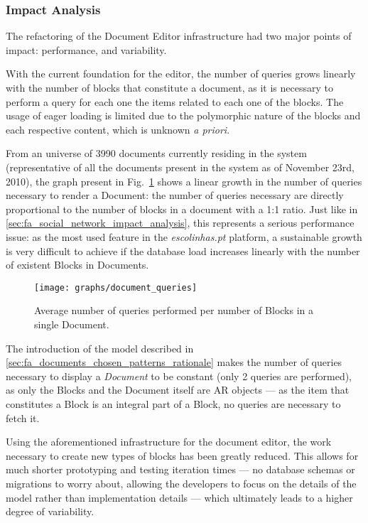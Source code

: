 \subsubsection{Impact Analysis}\label{sec:fa_documents_impact_analysis}

The refactoring of the Document Editor infrastructure had two major points of impact: performance, and variability.


With the current foundation for the editor, the number of queries grows linearly with the number of blocks that constitute a document, as it is necessary to perform a query for each one the items related to each one of the blocks. The usage of eager loading is limited due to the polymorphic nature of the blocks and each respective content, which is unknown \emph{a priori}.

From an universe of 3990 documents currently residing in the system (representative of all the documents present in the system as of November 23rd, 2010), the graph present in Fig.~\ref{fig:queries_per_blocks_in_document} shows a linear growth in the number of queries necessary to render a Document: the number of queries necessary are directly proportional to the number of blocks in a document with a 1:1 ratio. Just like in \ref{sec:fa_social_network_impact_analysis}, this represents a serious performance issue: as the most used feature in the \emph{escolinhas.pt} platform, a sustainable growth is very difficult to achieve if the database load increases linearly with the number of existent Blocks in Documents.

\begin{figure}[h]
  \centering
  \texttt{[image: graphs/document\_queries]}
  \caption{Average number of queries performed per number of Blocks in a single Document.}
  \label{fig:queries_per_blocks_in_document}
\end{figure}

The introduction of the model described in \ref{sec:fa_documents_chosen_patterns_rationale} makes the number of queries necessary to display a \emph{Document} to be constant (only 2 queries are performed), as only the Blocks and the Document itself are AR objects --- as the item that constitutes a Block is an integral part of a Block, no queries are necessary to fetch it.


Using the aforementioned infrastructure for the document editor, the work necessary to create new types of blocks has been greatly reduced. This allows for much shorter prototyping and testing iteration times --- no database schemas or migrations to worry about, allowing the developers to focus on the details of the model rather than implementation details --- which ultimately leads to a higher degree of variability.

